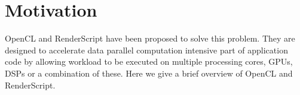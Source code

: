 \section{Motivation}
\label{sec:motivation}


OpenCL and RenderScript have been proposed to solve this problem. They are
designed to accelerate data parallel computation intensive part of application
code by allowing workload to be executed on multiple processing cores, GPUs,
DSPs or a combination of these. Here we give a brief overview of OpenCL and
RenderScript.



